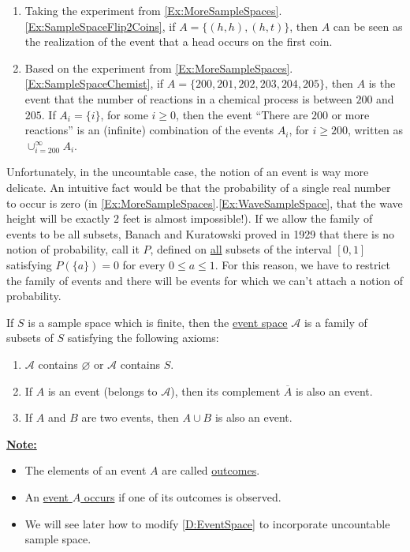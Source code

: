 \begin{example}
\begin{enumerate}[label=\alph*)]
\item Taking the experiment from \cref{Ex:MoreSampleSpaces}.\ref{Ex:SampleSpaceFlip2Coins}, if $A = \{ (h, h) , (h, t) \}$, then $A$ can be seen as the realization of the event that a head occurs on the first coin.
\item Based on the experiment from \cref{Ex:MoreSampleSpaces}.\ref{Ex:SampleSpaceChemist}, if $A = \{ 200 , 201 , 202, 203, 204, 205 \}$, then $A$ is the event that the number of reactions in a chemical process is between $200$ and $205$. If $A_i = \{ i \}$, for some $i \geq 0$, then the event ``There are $200$ or more reactions'' is an (infinite) combination of the events $A_i$, for $i \geq 200$, written as $\cup_{i = 200}^\infty A_i$.
\end{enumerate}
\end{example}

Unfortunately, in the uncountable case, the notion of an event is way more delicate. An intuitive fact would be that the probability of a single real number to occur is zero (in \cref{Ex:MoreSampleSpaces}.\ref{Ex:WaveSampleSpace}, that the wave height will be exactly $2$ feet is almost impossible!). If we allow the family of events to be all subsets, Banach and Kuratowski proved in 1929 that there is no notion of probability, call it $P$, defined on \underline{all} subsets of the interval $[0, 1]$ satisfying $P (\{ a \} ) = 0$ for every $0 \leq a \leq 1$. For this reason, we have to restrict the family of events and there will be events for which we can't attach a notion of probability.

\begin{definition}\label{D:EventSpace}
If $S$ is a sample space which is finite, then the \underline{event space} $\mathcal{A}$ is a family of subsets of $S$ satisfying the following axioms:
	\begin{enumerate}[label=\alph*)]
	\item $\mathcal{A}$ contains $\varnothing$ or $\mathcal{A}$ contains $S$.
	\item If $A$ is an event (belongs to $\mathcal{A}$), then its complement $\overline{A}$ is also an event.
	\item If $A$ and $B$ are two events, then $A \cup B$ is also an event.
	\end{enumerate}
\end{definition}

\underline{\textbf{Note:}}
	\begin{itemize}
	\item The elements of an event $A$ are called \underline{outcomes}.
	\item An \underline{event $A$ occurs} if one of its outcomes is observed.
	\item We will see later how to modify \cref{D:EventSpace}  to incorporate uncountable sample space.
	\end{itemize}
	
